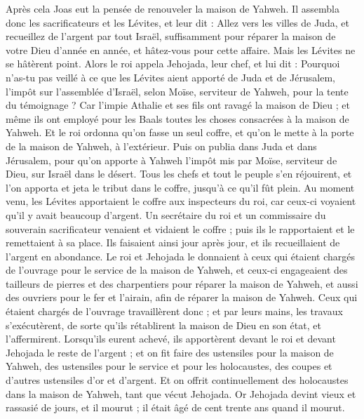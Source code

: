 \begin{multicols}{2}
Après cela Joas eut la pensée de renouveler la maison de Yahweh.
Il assembla donc les sacrificateurs et les Lévites, et leur dit : Allez vers les villes de Juda, et recueillez de l'argent par tout Israël, suffisamment pour réparer la maison de votre Dieu d'année en année, et hâtez-vous pour cette affaire. Mais les Lévites ne se hâtèrent point.
Alors le roi appela Jehojada, leur chef, et lui dit : Pourquoi n'as-tu pas veillé à ce que les Lévites aient apporté de Juda et de Jérusalem, l'impôt sur l'assemblée d'Israël, selon Moïse, serviteur de Yahweh, pour la tente du témoignage ?
Car l'impie Athalie et ses fils ont ravagé la maison de Dieu ; et même ils ont employé pour les Baals toutes les choses consacrées à la maison de Yahweh.
Et le roi ordonna qu'on fasse un seul coffre, et qu'on le mette à la porte de la maison de Yahweh, à l’extérieur.
Puis on publia dans Juda et dans Jérusalem, pour qu'on apporte à Yahweh l'impôt mis par Moïse, serviteur de Dieu, sur Israël dans le désert.
Tous les chefs et tout le peuple s'en réjouirent, et l'on apporta et jeta le tribut dans le coffre, jusqu'à ce qu'il fût plein.
Au moment venu, les Lévites apportaient le coffre aux inspecteurs du roi, car ceux-ci voyaient qu'il y avait beaucoup d'argent. Un secrétaire du roi et un commissaire du souverain sacrificateur venaient et vidaient le coffre ; puis ils le rapportaient et le remettaient à sa place. Ils faisaient ainsi jour après jour, et ils recueillaient de l'argent en abondance.
Le roi et Jehojada le donnaient à ceux qui étaient chargés de l'ouvrage pour le service de la maison de Yahweh, et ceux-ci engageaient des tailleurs de pierres et des charpentiers pour réparer la maison de Yahweh, et aussi des ouvriers pour le fer et l’airain, afin de réparer la maison de Yahweh.
Ceux qui étaient chargés de l'ouvrage travaillèrent donc ; et par leurs mains, les travaux s’exécutèrent, de sorte qu'ils rétablirent la maison de Dieu en son état, et l'affermirent.
Lorsqu'ils eurent achevé, ils apportèrent devant le roi et devant Jehojada le reste de l'argent ; et on fit faire des ustensiles pour la maison de Yahweh, des ustensiles pour le service et pour les holocaustes, des coupes et d'autres ustensiles d'or et d'argent. Et on offrit continuellement des holocaustes dans la maison de Yahweh, tant que vécut Jehojada.
Or Jehojada devint vieux et rassasié de jours, et il mourut ; il était âgé de cent trente ans quand il mourut.

\end{multicols}
